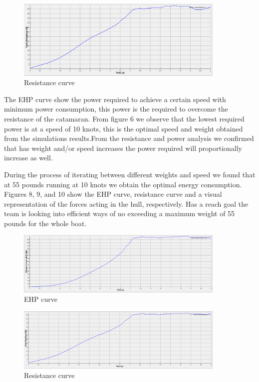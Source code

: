 \documentclass[12pt]{article}
\begin{document}
\begin{figure}[h!]
    \centering
    \includegraphics[width=10cm]{images/02-2023/cfd/60 lbs/resistance}
    \caption{Resistance curve}
    \label{fig:my_label}
\end{figure}

The EHP curve show the power required to achieve a certain speed with minimum power consumption, this power is the required to overcome the resistance of the catamaran. From figure 6 we observe that the lowest required power is at a speed of 10 knots, this is the optimal speed and weight obtained from the simulations results.From the resistance and power analysis we confirmed that has weight and/or speed increases the power required will proportionally increase as well. 

During the process of iterating between different weights and speed we found that at 55 pounds running at 10 knots we obtain the optimal energy consumption. Figures 8, 9, and 10 show the EHP curve, resistance curve and a visual representation of the forces acting in the hull, respectively. Has a reach goal the team is looking into efficient ways of no exceeding a maximum weight of 55 pounds for the whole boat. 


\begin{figure}[h!]
    \centering
    \includegraphics[width=10cm]{images/02-2023/cfd/55 lbs/EHP_10 knts}
    \caption{EHP curve}
    \label{fig:my_label}
\end{figure}

\begin{figure}[h!]
    \centering
    \includegraphics[width=10cm]{images/02-2023/cfd/55 lbs/Resistance_10_knts}
    \caption{Resistance curve}
    \label{fig:my_label}
\end{figure}
\end{document}
